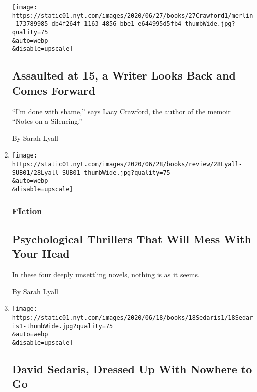 \begin{enumerate}
  \texttt{[image: https://static01.nyt.com/images/2020/06/27/books/27Crawford1/merlin\_173789985\_db4f264f-1163-4856-bbe1-e644995d5fb4-thumbWide.jpg?quality=75\\\&auto=webp\\\&disable=upscale]}

  \hypertarget{assaulted-at-15-a-writer-looks-back-and-comes-forward}{%
  \subsection{Assaulted at 15, a Writer Looks Back and Comes
  Forward}\label{assaulted-at-15-a-writer-looks-back-and-comes-forward}}

  ``I'm done with shame,'' says Lacy Crawford, the author of the memoir
  ``Notes on a Silencing.''

  By Sarah Lyall
\item
  \href{/2020/06/26/books/review/psychological-thrillers-new-this-little-family-the-patient.html}{}

  \texttt{[image: https://static01.nyt.com/images/2020/06/28/books/review/28Lyall-SUB01/28Lyall-SUB01-thumbWide.jpg?quality=75\\\&auto=webp\\\&disable=upscale]}

  \hypertarget{fiction-1}{%
  \subsubsection{FIction}\label{fiction-1}}

  \hypertarget{psychological-thrillers-that-will-mess-with-your-head}{%
  \subsection{Psychological Thrillers That Will Mess With Your
  Head}\label{psychological-thrillers-that-will-mess-with-your-head}}

  In these four deeply unsettling novels, nothing is as it seems.

  By Sarah Lyall
\item
  \href{/2020/06/20/books/david-sedaris-nyc-quarantine-life-coronavirus.html}{}

  \texttt{[image: https://static01.nyt.com/images/2020/06/18/books/18Sedaris1/18Sedaris1-thumbWide.jpg?quality=75\\\&auto=webp\\\&disable=upscale]}

  \hypertarget{david-sedaris-dressed-up-with-nowhere-to-go}{%
  \subsection{David Sedaris, Dressed Up With Nowhere to
  Go}\label{david-sedaris-dressed-up-with-nowhere-to-go}}


\end{enumerate}
